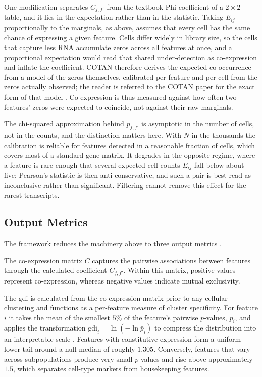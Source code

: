 One modification separates $C_{f,f'}$ from the textbook Phi coefficient of a $2 \times 2$ table, and it lies in the expectation rather than in the statistic. Taking $E_{ij}$ proportionally to the marginals, as above, assumes that every cell has the same chance of expressing a given feature. Cells differ widely in library size, so the cells that capture less RNA accumulate zeros across all features at once, and a proportional expectation would read that shared under-detection as co-expression and inflate the coefficient. COTAN therefore derives the expected co-occurrence from a model of the zeros themselves, calibrated per feature and per cell from the zeros actually observed; the reader is referred to the COTAN paper for the exact form of that model \cite{galfre2021cotan}. Co-expression is thus measured against how often two features' zeros were expected to coincide, not against their raw marginals.

The chi-squared approximation behind $p_{f,f'}$ is asymptotic in the number of cells, not in the counts, and the distinction matters here. With $N$ in the thousands the calibration is reliable for features detected in a reasonable fraction of cells, which covers most of a standard gene matrix. It degrades in the opposite regime, where a feature is rare enough that several expected cell counts $E_{ij}$ fall below about five; Pearson's statistic is then anti-conservative, and such a pair is best read as inconclusive rather than significant. Filtering cannot remove this effect for the rarest transcripts.

\subsection{Output Metrics}

The framework reduces the machinery above to three output metrics \cite{galfre2021cotan}.

The co-expression matrix $C$ captures the pairwise associations between features through the calculated coefficient $C_{f,f'}$. Within this matrix, positive values represent co-expression, whereas negative values indicate mutual exclusivity.

The \gls{gdi} is calculated from the co-expression matrix prior to any cellular clustering and functions as a per-feature measure of cluster specificity. For feature $i$ it takes the mean of the smallest $5\%$ of the feature's pairwise $p$-values, $\bar{p}_i$, and applies the transformation $\mathrm{gdi}_i = \ln(-\ln \bar{p}_i)$ to compress the distribution into an interpretable scale \cite{galfre2021cotan}. Features with constitutive expression form a uniform lower tail around a null median of roughly $1.305$. Conversely, features that vary across subpopulations produce very small $p$-values and rise above approximately $1.5$, which separates cell-type markers from housekeeping features.

